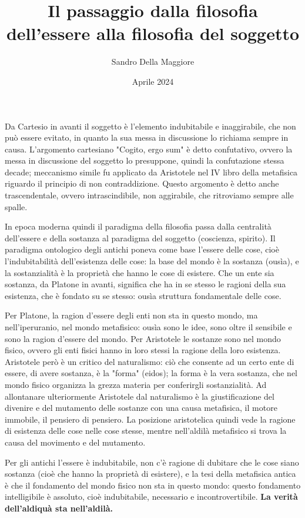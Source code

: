 \documentclass[a4paper,12pt,oneside]{article}%
\begin{document}
	\author{Sandro Della Maggiore}
	\title{Il passaggio dalla filosofia dell'essere alla filosofia del soggetto}
	\date{Aprile 2024}
	
	\maketitle

Da Cartesio in avanti il soggetto è l'elemento indubitabile e inaggirabile, che non può essere evitato, in quanto la sua messa in discussione lo richiama sempre in causa. L'argomento cartesiano "Cogito, ergo sum" è detto confutativo, ovvero la messa in discussione del soggetto lo presuppone, quindi la confutazione stessa decade; meccanismo simile fu applicato da Aristotele nel IV libro della metafisica riguardo il principio di non contraddizione. Questo argomento è detto anche trascendentale, ovvero intrascindibile, non aggirabile, che ritroviamo sempre alle spalle.

In epoca moderna quindi il paradigma della filosofia passa dalla centralità dell'essere e della sostanza al paradigma del soggetto (coscienza, spirito). Il paradigma ontologico degli antichi poneva come base l'essere delle cose, cioè l'indubitabilità dell'esistenza delle cose: la base del mondo è la sostanza (ousìa), e la sostanzialità è la proprietà che hanno le cose di esistere. Che un ente sia sostanza, da Platone in avanti, significa che ha in se stesso le ragioni della sua esistenza, che è fondato su se stesso: ousìa struttura fondamentale delle cose.

Per Platone, la ragion d'essere degli enti non sta in questo mondo, ma nell'iperuranio, nel mondo metafisico: ousìa sono le idee, sono oltre il sensibile e sono la ragion d'essere del mondo. Per Aristotele le sostanze sono nel mondo fisico, ovvero gli enti fisici hanno in loro stessi la ragione della loro esistenza. Aristotele però è un critico del naturalismo: ciò che consente ad un certo ente di essere, di avere sostanza, è la "forma" (eidos); la forma è la vera sostanza, che nel mondo fisico organizza la grezza materia per conferirgli sostanzialità. Ad allontanare ulteriormente Aristotele dal naturalismo è la giustificazione del divenire e del mutamento delle sostanze con una causa metafisica, il motore immobile, il pensiero di pensiero. La posizione aristotelica quindi vede la ragione di esistenza delle cose nelle cose stesse, mentre nell'aldilà metafisico si trova la causa del movimento e del mutamento.

Per gli antichi l'essere è indubitabile, non c'è ragione di dubitare che le cose siano sostanza (cioè che hanno la proprietà di esistere), e la tesi della metafisica antica è che il fondamento del mondo fisico non sta in questo mondo: questo fondamento intelligibile è assoluto, cioè indubitabile, necessario e incontrovertibile. \textbf{La verità dell'aldiquà sta nell'aldilà.}
\end{document}
